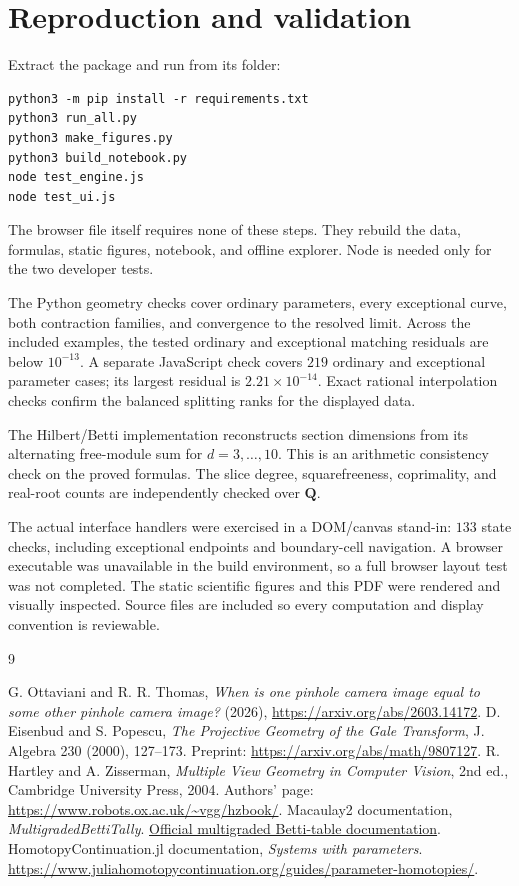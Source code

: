 \documentclass[11pt]{article}
\begin{document}
\section{Reproduction and validation}
Extract the package and run from its folder:
\begin{verbatim}
python3 -m pip install -r requirements.txt
python3 run_all.py
python3 make_figures.py
python3 build_notebook.py
node test_engine.js
node test_ui.js
\end{verbatim}
The browser file itself requires none of these steps. They rebuild the data, formulas, static figures, notebook, and offline explorer. Node is needed only for the two developer tests.

The Python geometry checks cover ordinary parameters, every exceptional curve, both contraction families, and convergence to the resolved limit. Across the included examples, the tested ordinary and exceptional matching residuals are below $10^{-13}$. A separate JavaScript check covers $219$ ordinary and exceptional parameter cases; its largest residual is $2.21\times10^{-14}$. Exact rational interpolation checks confirm the balanced splitting ranks for the displayed data.

The Hilbert/Betti implementation reconstructs section dimensions from its alternating free-module sum for $d=3,\ldots,10$. This is an arithmetic consistency check on the proved formulas. The slice degree, squarefreeness, coprimality, and real-root counts are independently checked over $\mathbf Q$.

The actual interface handlers were exercised in a DOM/canvas stand-in: $133$ state checks, including exceptional endpoints and boundary-cell navigation. A browser executable was unavailable in the build environment, so a full browser layout test was not completed. The static scientific figures and this PDF were rendered and visually inspected. Source files are included so every computation and display convention is reviewable.

\begin{thebibliography}{9}\raggedright
{} G. Ottaviani and R. R. Thomas, \emph{When is one pinhole camera image equal to some other pinhole camera image?} (2026), \url{https://arxiv.org/abs/2603.14172}.
 D. Eisenbud and S. Popescu, \emph{The Projective Geometry of the Gale Transform}, J. Algebra 230 (2000), 127--173. Preprint: \url{https://arxiv.org/abs/math/9807127}.
 R. Hartley and A. Zisserman, \emph{Multiple View Geometry in Computer Vision}, 2nd ed., Cambridge University Press, 2004. Authors' page: \url{https://www.robots.ox.ac.uk/~vgg/hzbook/}.
 Macaulay2 documentation, \emph{MultigradedBettiTally}. \href{https://macaulay2.com/doc/Macaulay2/share/doc/Macaulay2/Macaulay2Doc/html/___Multigraded__Betti__Tally.html}{Official multigraded Betti-table documentation}.
 HomotopyContinuation.jl documentation, \emph{Systems with parameters}. \url{https://www.juliahomotopycontinuation.org/guides/parameter-homotopies/}.
\end{thebibliography}
\end{document}

